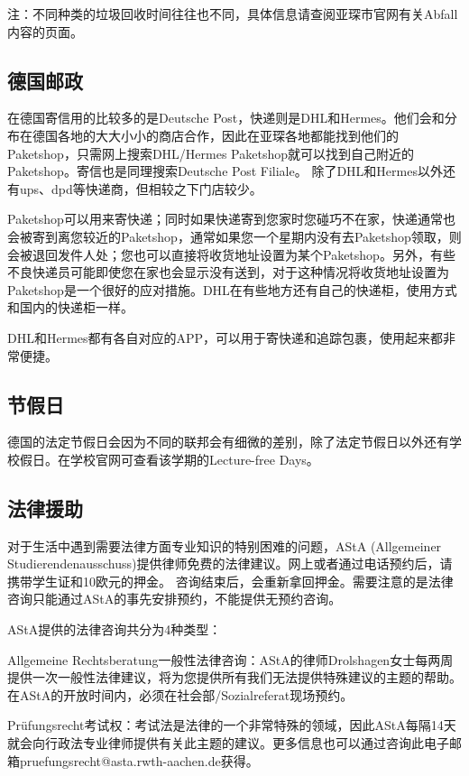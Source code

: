     注：不同种类的垃圾回收时间往往也不同，具体信息请查阅亚琛市官网有关Abfall内容的页面。

  \subsection{德国邮政}

    在德国寄信用的比较多的是Deutsche Post，快递则是DHL和Hermes。他们会和分布在德国各地的大大小小的商店合作，因此在亚琛各地都能找到他们的Paketshop，只需网上搜索DHL/Hermes Paketshop就可以找到自己附近的Paketshop。寄信也是同理搜索Deutsche Post Filiale。 除了DHL和Hermes以外还有ups、dpd等快递商，但相较之下门店较少。

    Paketshop可以用来寄快递；同时如果快递寄到您家时您碰巧不在家，快递通常也会被寄到离您较近的Paketshop，通常如果您一个星期内没有去Paketshop领取，则会被退回发件人处；您也可以直接将收货地址设置为某个Paketshop。另外，有些不良快递员可能即使您在家也会显示没有送到，对于这种情况将收货地址设置为Paketshop是一个很好的应对措施。DHL在有些地方还有自己的快递柜，使用方式和国内的快递柜一样。

    DHL和Hermes都有各自对应的APP，可以用于寄快递和追踪包裹，使用起来都非常便捷。

  \subsection{节假日}

    德国的法定节假日会因为不同的联邦会有细微的差别，除了法定节假日以外还有学校假日。在学校官网可查看该学期的Lecture-free Days。

  \subsection{法律援助}

    对于生活中遇到需要法律方面专业知识的特别困难的问题，AStA (Allgemeiner Studierendenausschuss)提供律师免费的法律建议。网上或者通过电话预约后，请携带学生证和10欧元的押金。 咨询结束后，会重新拿回押金。需要注意的是法律咨询只能通过AStA的事先安排预约，不能提供无预约咨询。

    AStA提供的法律咨询共分为4种类型：

    Allgemeine Rechtsberatung一般性法律咨询：AStA的律师Drolshagen女士每两周提供一次一般性法律建议，将为您提供所有我们无法提供特殊建议的主题的帮助。 在AStA的开放时间内，必须在社会部/Sozialreferat现场预约。

    Prüfungsrecht考试权：考试法是法律的一个非常特殊的领域，因此AStA每隔14天就会向行政法专业律师提供有关此主题的建议。更多信息也可以通过咨询此电子邮箱pruefungsrecht@asta.rwth-aachen.de获得。

